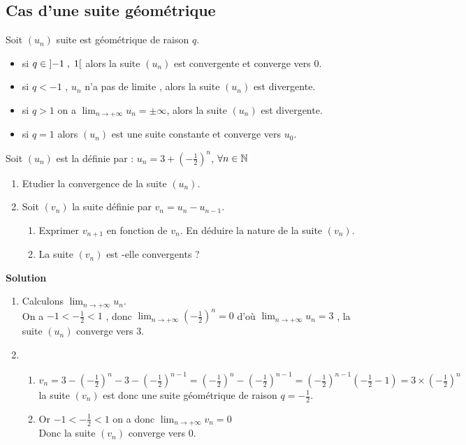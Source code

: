  \subsection*{Cas d'une suite géométrique} 
 Soit $(u_{n})$ suite est géométrique de raison $ q $.
 \begin{itemize}
 \item si $ q\in\left]-1 \;,\; 1\right[ $ alors la suite $(u_{n})$ est convergente et converge vers $ 0 $.
 \item si $ q< -1  $ , $u_{n}$ n'a pas de limite ,  alors la suite $(u_{n})$ est divergente.
 \item si $ q >1  $ $  $on a $ \displaystyle \lim_{n \to  +\infty} u_{n}= \pm\infty $, alors la suite $(u_{n})$ est divergente.
\item si $ q=1  $ alors $(u_{n})$  est une suite constante et converge vers $u_{0}$.
 \end{itemize}
\begin{exercice}
Soit $(u_{n})$ est la définie par : $ u_{n}=3+(-\frac{1}{2})^{n} $, $ \forall n\in\mathbb{N} $
 \begin{enumerate}
 \item Etudier la convergence de la suite $(u_{n})$.
 \item Soit $(v_{n})$ la suite définie par $ v_{n}=u_{n}-u_{n-1} $.
 \begin{enumerate}
 \item Exprimer $v_{n+1}$ en fonction de $ v_{n} $. En déduire la nature de la suite  $(v_{n})$.
 \item La suite  $(v_{n})$ est -elle convergents ?
 \end{enumerate}
 \end{enumerate}
 \end{exercice}
 \textbf{Solution}
 \begin{enumerate}
 \item Calculons $ \displaystyle \lim_{n \to  +\infty} u_{n} $.\\
 On a $ -1< -\frac{1}{2}< 1 $ , donc $\displaystyle \lim_{n \to  +\infty}(-\frac{1}{2})^{n}=0$ d'où $ \displaystyle \lim_{n \to  +\infty} u_{n}=3 $ , la suite $(u_{n})$ converge vers $3.$
 \item 
 \begin{enumerate}
 \item $ v_{n}= 3-(-\frac{1}{2})^{n}-3-(-\frac{1}{2})^{n-1}= (-\frac{1}{2})^{n}-(-\frac{1}{2})^{n-1} = (-\frac{1}{2})^{n-1}(-\frac{1}{2}-1) =3\times(-\frac{1}{2})^{n}$ 
 la suite $ (v_{n}) $ est donc une suite géométrique de raison $ q=-\frac{1}{2} $.
 \item Or $ -1< -\frac{1}{2}< 1 $ on a donc $ \displaystyle \lim_{n \to  +\infty} v_{n}=0 $ \\
 Donc la suite $ (v_{n}) $ converge vers $ 0. $
 \end{enumerate}
 \end{enumerate}
